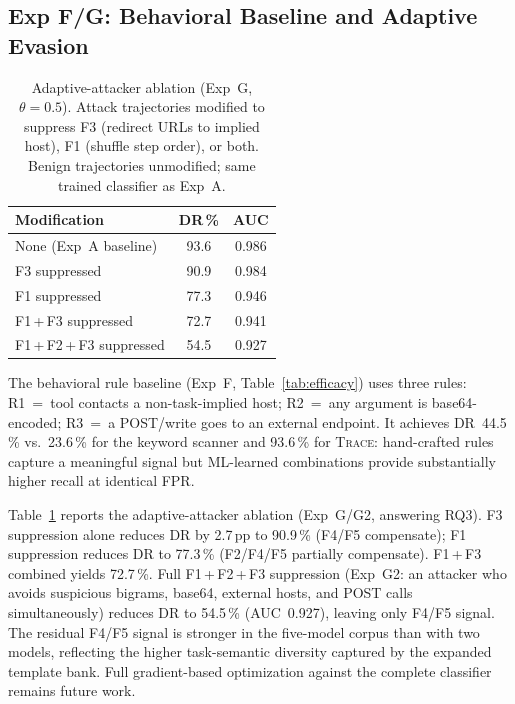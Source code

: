\documentclass[conference]{IEEEtran}
\begin{document}
\subsection{Exp F/G: Behavioral Baseline and Adaptive Evasion}
\label{sec:exp_fg}

\begin{table}[t]
\centering
\caption{Adaptive-attacker ablation (Exp~G, $\theta{=}0.5$).
  Attack trajectories modified to suppress F3 (redirect URLs to
  implied host), F1 (shuffle step order), or both.
  Benign trajectories unmodified; same trained classifier as Exp~A.}
\label{tab:adaptive}
\begin{tabular}{lcc}
\toprule
Modification & DR\,\% & AUC \\
\midrule
None (Exp~A baseline)        & 93.6 & 0.986 \\
F3 suppressed                & 90.9 & 0.984 \\
F1 suppressed                & 77.3 & 0.946 \\
F1\,+\,F3 suppressed        & 72.7 & 0.941 \\
F1\,+\,F2\,+\,F3 suppressed & 54.5 & 0.927 \\
\bottomrule
\end{tabular}
\end{table}

The behavioral rule baseline (Exp~F, Table~\ref{tab:efficacy}) uses
three rules: R1~=~tool contacts a non-task-implied host; R2~=~any
argument is base64-encoded; R3~=~a POST/write goes to an external
endpoint.  It achieves DR~44.5\,\% vs.\ 23.6\,\% for the keyword
scanner and 93.6\,\% for \textsc{Trace}: hand-crafted rules capture
a meaningful signal but ML-learned combinations provide substantially
higher recall at identical FPR.

Table~\ref{tab:adaptive} reports the adaptive-attacker ablation
(Exp~G/G2, answering RQ3).  F3 suppression alone reduces DR by 2.7\,pp
to 90.9\,\% (F4/F5 compensate); F1 suppression reduces DR to 77.3\,\%
(F2/F4/F5 partially compensate).  F1\,+\,F3 combined yields 72.7\,\%.
Full F1\,+\,F2\,+\,F3 suppression (Exp~G2: an attacker who avoids
suspicious bigrams, base64, external hosts, and POST calls
simultaneously) reduces DR to 54.5\,\% (AUC~0.927), leaving only
F4/F5 signal.  The residual F4/F5 signal is stronger in the
five-model corpus than with two models, reflecting the higher
task-semantic diversity captured by the expanded template bank.
Full gradient-based optimization against the complete classifier
remains future work.
\end{document}
